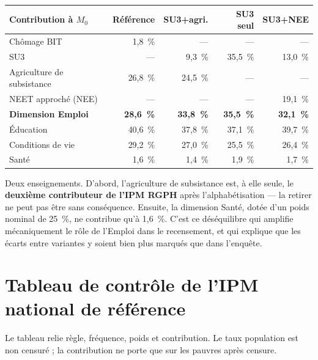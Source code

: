 \documentclass[11pt,a4paper]{article}
\begin{document}
\begin{center}
\small
\begin{tabular}{@{}lrrrr@{}}
\toprule
\textbf{Contribution à $M_0$} & \textbf{Référence} & \textbf{SU3+agri.} &
\textbf{SU3 seul} & \textbf{SU3+NEE} \\
\midrule
Chômage BIT & 1,8~\% & --- & --- & --- \\
SU3 & --- & 9,3~\% & 35,5~\% & 13,0~\% \\
Agriculture de subsistance & 26,8~\% & 24,5~\% & --- & --- \\
NEET approché (NEE) & --- & --- & --- & 19,1~\% \\
\midrule
\textbf{Dimension Emploi} & \textbf{28,6~\%} & \textbf{33,8~\%} & \textbf{35,5~\%} &
\textbf{32,1~\%} \\
Éducation & 40,6~\% & 37,8~\% & 37,1~\% & 39,7~\% \\
Conditions de vie & 29,2~\% & 27,0~\% & 25,5~\% & 26,4~\% \\
Santé & 1,6~\% & 1,4~\% & 1,9~\% & 1,7~\% \\
\bottomrule
\end{tabular}
\end{center}

Deux enseignements. D'abord, l'agriculture de subsistance est, à elle seule, le
\textbf{deuxième contributeur de l'IPM RGPH} après l'alphabétisation --- la retirer ne peut pas
être sans conséquence. Ensuite, la dimension Santé, dotée d'un poids nominal de 25~\%, ne
contribue qu'à 1,6~\%. C'est ce déséquilibre qui amplifie mécaniquement le rôle de l'Emploi
dans le recensement, et qui explique que les écarts entre variantes y soient bien plus marqués
que dans l'enquête.

\section{Tableau de contrôle de l'IPM national de référence}

Le tableau relie règle, fréquence, poids et contribution. Le taux population est non censuré ;
la contribution ne porte que sur les pauvres après censure.
\end{document}
